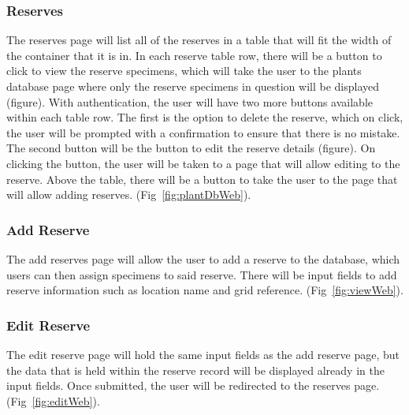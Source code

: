         \subsubsection{Reserves}
            The reserves page will list all of the reserves in a table that will fit the width of the container that it is in. In each reserve table row, there will be a button to click to view the reserve specimens, which will take the user to the plants database page where only the reserve specimens in question will be displayed (figure). With authentication, the user will have two more buttons available within each table row. The first is the option to delete the reserve, which on click, the user will be prompted with a confirmation to ensure that there is no mistake. The second button will be the button to edit the reserve details (figure). On clicking the button, the user will be taken to a page that will allow editing to the reserve. Above the table, there will be a button to take the user to the page that will allow adding reserves. (Fig~\ref{fig:plantDbWeb}).

        \subsubsection{Add Reserve}
           The add reserves page will allow the user to add a reserve to the database, which users can then assign specimens to said reserve. There will be input fields to add reserve information such as location name and grid reference.  (Fig~\ref{fig:viewWeb}). 
        
        \subsubsection{Edit Reserve}
           The edit reserve page will hold the same input fields as the add reserve page, but the data that is held within the reserve record will be displayed already in the input fields. Once submitted, the user will be redirected to the reserves page. (Fig~\ref{fig:editWeb}).

